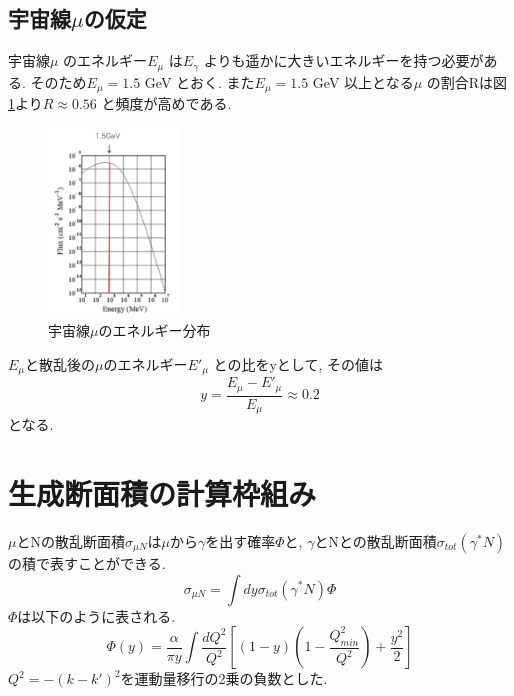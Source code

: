 \subsection{宇宙線$\mu$の仮定}
宇宙線$\mu$ のエネルギー$E_\mu$ は$E_\gamma$ よりも遥かに大きいエネルギーを持つ必要がある.
そのため$E_\mu = 1.5$ GeV とおく.
また$E_\mu = 1.5$ GeV 以上となる$\mu$ の割合Rは図\ref{fig:sigma2}より$R \approx 0.56$ と頻度が高めである.
\begin{figure}[H]
    \centering
    \includegraphics[height=5cm]{img/cosimic_ray_energy_distribution.png}
    \caption{宇宙線$\mu$のエネルギー分布 \cite{cosmic_ray}}
    \label{fig:sigma2}
\end{figure}
$E_\mu$と散乱後の$\mu$のエネルギー$E'_\mu$ との比をyとして, その値は
\begin{equation}
    y = \dfrac{E_\mu - E'_\mu}{E_\mu} \approx 0.2
\end{equation}
となる.

\section{生成断面積の計算枠組み}
$\mu$とNの散乱断面積$\sigma_{\mu N}$は$\mu$から$\gamma$を出す確率$\Phi$と,
$\gamma$とNとの散乱断面積$\sigma_{tot}(\gamma^* N)$の積で表すことができる.
\begin{equation}
    \sigma_{\mu N} =\int dy  \sigma_{tot}(\gamma^* N) \Phi
\end{equation}
$\Phi$は以下のように表される.
\begin{equation}
    \Phi(y) = \dfrac{\alpha}{\pi y} \int \dfrac{dQ^2}{Q^2} [(1-y)(1 - \dfrac{Q^2_{min}}{Q^2}) + \dfrac{y^2}{2}]
\end{equation}
$Q^2 = - (k - k')^2 $を運動量移行の2乗の負数とした.

